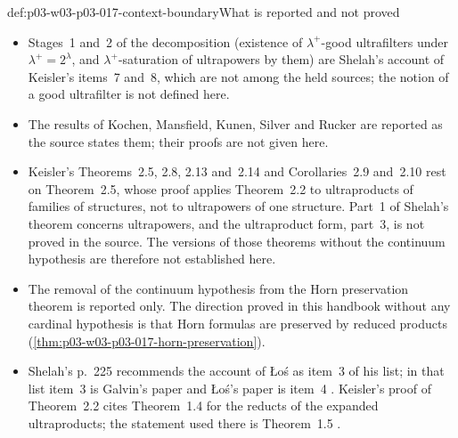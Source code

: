 \begin{proofboundary}{def:p03-w03-p03-017-context-boundary}{What is reported and not proved}
\begin{itemize}
  \item Stages~1 and~2 of the decomposition (existence of
        \(\lambda^+\)-good ultrafilters under \(\lambda^+=2^\lambda\), and
        \(\lambda^+\)-saturation of ultrapowers by them) are Shelah's
        account of Keisler's items~7 and~8, which are not among the held
        sources; the notion of a good ultrafilter is not defined here.
  \item The results of Kochen, Mansfield, Kunen, Silver and Rucker are
        reported as the source states them; their proofs are not given
        here.
  \item Keisler's Theorems~2.5, 2.8, 2.13 and~2.14 and Corollaries~2.9
        and~2.10 rest on Theorem~2.5,
        whose proof applies Theorem~2.2 to ultraproducts of families of
        structures, not to ultrapowers of one structure.  Part~1 of Shelah's
        theorem concerns ultrapowers, and the ultraproduct form, part~3, is
        not proved in the source.  The versions of those theorems without
        the continuum hypothesis are therefore not established here.
  \item The removal of the continuum hypothesis from the Horn preservation
        theorem is reported only.  The direction proved in this handbook
        without any cardinal hypothesis is that Horn formulas are preserved
        by reduced products (\cref{thm:p03-w03-p03-017-horn-preservation}).
  \item Shelah's p.~225 recommends the account of \L o\'s as item~3 of his
        list; in that list item~3 is Galvin's paper and \L o\'s's paper is
        item~4 \cite[pp.~225 and~232]{Shelah1971Ultrapowers}.  Keisler's
        proof of Theorem~2.2 cites Theorem~1.4 for the reducts of the
        expanded ultraproducts; the statement used there is Theorem~1.5
        \cite[pp.~484 and~486]{Keisler1961ElementaryClasses}.
\end{itemize}
\end{proofboundary}

